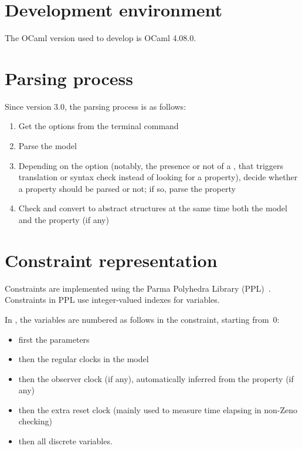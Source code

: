 \chapter{Development environment}

The OCaml version used to develop \imitator{} is OCaml 4.08.0.


\chapter{Parsing process}


Since version 3.0, the parsing process is as follows:

\begin{enumerate}
	\item Get the options from the terminal command
	\item Parse the model
	\item Depending on the option (notably, the presence or not of a , that triggers translation or syntax check instead of looking for a property), decide whether a property should be parsed or not; if so, parse the property
	\item Check and convert to abstract structures at the same time both the model and the property (if any)
\end{enumerate}



\chapter{Constraint representation}

Constraints are implemented using the Parma Polyhedra Library (PPL)~\cite{BHZ08}.
Constraints in PPL use integer-valued indexes for variables.

In \imitator{}, the variables are numbered as follows in the constraint, starting from~0:
\begin{itemize}
	\item first the parameters
	\item then the regular clocks in the model
	\item then the observer clock (if any), automatically inferred from the property (if any)
	\item then the extra reset clock (mainly used to measure time elapsing in non-Zeno checking)
	\item then all discrete variables.
\end{itemize}

